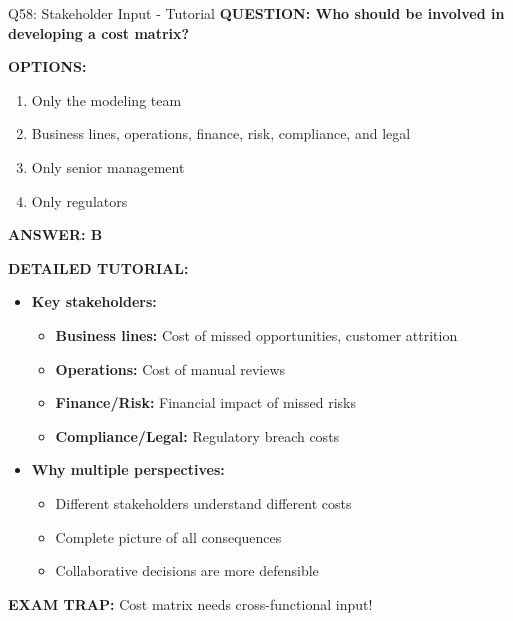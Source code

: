 \documentclass[8pt]{beamer}
\begin{document}
	\begin{frame}{Q58: Stakeholder Input - Tutorial}
		\fontsize{6.5}{7.5}\selectfont
		\textbf{QUESTION: Who should be involved in developing a cost matrix?}
		
		\vspace{0.1cm}
		\textbf{OPTIONS:}
		\begin{enumerate}
			\item Only the modeling team
			\item Business lines, operations, finance, risk, compliance, and legal
			\item Only senior management
			\item Only regulators
		\end{enumerate}
		
		\vspace{0.1cm}
		\textcolor{myblue}{\textbf{ANSWER: B}}
		
		\vspace{0.1cm}
		\textbf{DETAILED TUTORIAL:}
		\begin{itemize}
			\item \textbf{Key stakeholders:}
			\begin{itemize}
				\item \textbf{Business lines:} Cost of missed opportunities, customer attrition
				\item \textbf{Operations:} Cost of manual reviews
				\item \textbf{Finance/Risk:} Financial impact of missed risks
				\item \textbf{Compliance/Legal:} Regulatory breach costs
			\end{itemize}
			\item \textbf{Why multiple perspectives:}
			\begin{itemize}
				\item Different stakeholders understand different costs
				\item Complete picture of all consequences
				\item Collaborative decisions are more defensible
			\end{itemize}
		\end{itemize}
		
		\textcolor{myred}{\textbf{EXAM TRAP:}} Cost matrix needs \textcolor{myblue}{cross-functional input}!
	\end{frame}
	
\end{document}
